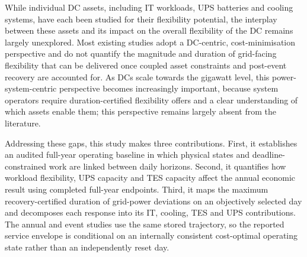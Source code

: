 \documentclass[lettersize,journal]{IEEEtran}
\newcommand{\rev}[1]{#1}
\begin{document}
\rev{While individual DC assets, including IT workloads, UPS batteries and cooling systems, have each been studied for their flexibility potential, the interplay between these assets and its impact on the overall flexibility of the DC remains largely unexplored. Most existing studies adopt a DC-centric, cost-minimisation perspective and do not quantify the magnitude and duration of grid-facing flexibility that can be delivered once coupled asset constraints and post-event recovery are accounted for. As DCs scale towards the gigawatt level, this power-system-centric perspective becomes increasingly important, because system operators require duration-certified flexibility offers and a clear understanding of which assets enable them; this perspective remains largely absent from the literature.}

Addressing these gaps, this study makes three contributions. First, it
establishes an audited full-year operating baseline in which physical states
and deadline-constrained work are linked between daily horizons. Second, it
quantifies how workload flexibility, UPS capacity and TES capacity affect the
annual economic result using completed full-year endpoints. Third, it maps the
maximum recovery-certified duration of grid-power deviations on an objectively
selected day and decomposes each response into its IT, cooling, TES and UPS
contributions. The annual and event studies use the same stored trajectory, so
the reported service envelope is conditional on an internally consistent
cost-optimal operating state rather than an independently reset day.


\end{document}
